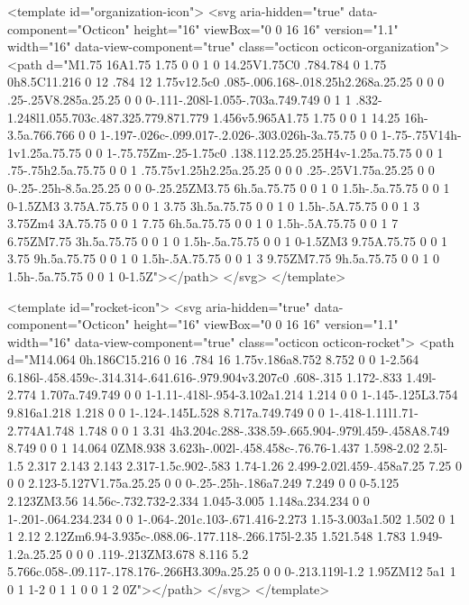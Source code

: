 <template id="organization-icon">
  <svg aria-hidden="true" data-component="Octicon" height="16" viewBox="0 0 16 16" version="1.1" width="16" data-view-component="true" class="octicon octicon-organization">
    <path d="M1.75 16A1.75 1.75 0 0 1 0 14.25V1.75C0 .784.784 0 1.75 0h8.5C11.216 0 12 .784 12 1.75v12.5c0 .085-.006.168-.018.25h2.268a.25.25 0 0 0 .25-.25V8.285a.25.25 0 0 0-.111-.208l-1.055-.703a.749.749 0 1 1 .832-1.248l1.055.703c.487.325.779.871.779 1.456v5.965A1.75 1.75 0 0 1 14.25 16h-3.5a.766.766 0 0 1-.197-.026c-.099.017-.2.026-.303.026h-3a.75.75 0 0 1-.75-.75V14h-1v1.25a.75.75 0 0 1-.75.75Zm-.25-1.75c0 .138.112.25.25.25H4v-1.25a.75.75 0 0 1 .75-.75h2.5a.75.75 0 0 1 .75.75v1.25h2.25a.25.25 0 0 0 .25-.25V1.75a.25.25 0 0 0-.25-.25h-8.5a.25.25 0 0 0-.25.25ZM3.75 6h.5a.75.75 0 0 1 0 1.5h-.5a.75.75 0 0 1 0-1.5ZM3 3.75A.75.75 0 0 1 3.75 3h.5a.75.75 0 0 1 0 1.5h-.5A.75.75 0 0 1 3 3.75Zm4 3A.75.75 0 0 1 7.75 6h.5a.75.75 0 0 1 0 1.5h-.5A.75.75 0 0 1 7 6.75ZM7.75 3h.5a.75.75 0 0 1 0 1.5h-.5a.75.75 0 0 1 0-1.5ZM3 9.75A.75.75 0 0 1 3.75 9h.5a.75.75 0 0 1 0 1.5h-.5A.75.75 0 0 1 3 9.75ZM7.75 9h.5a.75.75 0 0 1 0 1.5h-.5a.75.75 0 0 1 0-1.5Z"></path>
</svg>
</template>

<template id="rocket-icon">
  <svg aria-hidden="true" data-component="Octicon" height="16" viewBox="0 0 16 16" version="1.1" width="16" data-view-component="true" class="octicon octicon-rocket">
    <path d="M14.064 0h.186C15.216 0 16 .784 16 1.75v.186a8.752 8.752 0 0 1-2.564 6.186l-.458.459c-.314.314-.641.616-.979.904v3.207c0 .608-.315 1.172-.833 1.49l-2.774 1.707a.749.749 0 0 1-1.11-.418l-.954-3.102a1.214 1.214 0 0 1-.145-.125L3.754 9.816a1.218 1.218 0 0 1-.124-.145L.528 8.717a.749.749 0 0 1-.418-1.11l1.71-2.774A1.748 1.748 0 0 1 3.31 4h3.204c.288-.338.59-.665.904-.979l.459-.458A8.749 8.749 0 0 1 14.064 0ZM8.938 3.623h-.002l-.458.458c-.76.76-1.437 1.598-2.02 2.5l-1.5 2.317 2.143 2.143 2.317-1.5c.902-.583 1.74-1.26 2.499-2.02l.459-.458a7.25 7.25 0 0 0 2.123-5.127V1.75a.25.25 0 0 0-.25-.25h-.186a7.249 7.249 0 0 0-5.125 2.123ZM3.56 14.56c-.732.732-2.334 1.045-3.005 1.148a.234.234 0 0 1-.201-.064.234.234 0 0 1-.064-.201c.103-.671.416-2.273 1.15-3.003a1.502 1.502 0 1 1 2.12 2.12Zm6.94-3.935c-.088.06-.177.118-.266.175l-2.35 1.521.548 1.783 1.949-1.2a.25.25 0 0 0 .119-.213ZM3.678 8.116 5.2 5.766c.058-.09.117-.178.176-.266H3.309a.25.25 0 0 0-.213.119l-1.2 1.95ZM12 5a1 1 0 1 1-2 0 1 1 0 0 1 2 0Z"></path>
</svg>
</template>

